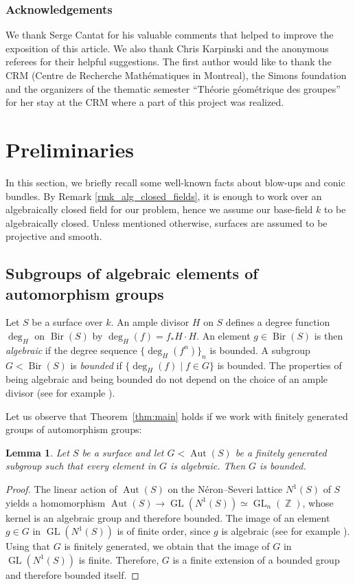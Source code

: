 \documentclass[11pt]{article}
\numberwithin{equation}{section}
\newcommand{\GL}{\operatorname{GL}}
\newcommand{\Z}{\operatorname{\mathbb{Z}}}
\newcommand{\Aut}{\operatorname{Aut}}
\newcommand{\Bir}{\operatorname{Bir}}
\theoremstyle{plain}
\newtheorem{lemma}[theorem]{Lemma}
\theoremstyle{definition}
\begin{document}
\subsubsection*{Acknowledgements}
We thank Serge Cantat for his valuable comments that helped to improve the exposition of this article. {We also thank Chris Karpinski and the anonymous referees for their helpful suggestions.}
The first author would like to thank the CRM (Centre de Recherche Mathématiques in Montreal), the Simons foundation and the organizers of the thematic semester ``Théorie géométrique des groupes'' for her stay at the CRM where a part of this project was realized.

\section{Preliminaries}
In this section, we briefly recall some well-known facts about blow-ups and conic bundles. {By Remark \ref{rmk_alg_closed_fields}, it is enough to work over an algebraically closed field for our problem, hence} we assume our base-field $k$ to be algebraically closed. Unless mentioned otherwise, surfaces are assumed to be projective and smooth.

\subsection{Subgroups of algebraic elements of automorphism groups}
{Let $S$ be a surface over $k$.} An ample divisor $H$ on $S$ defines a degree function $\deg_H$ on $\Bir(S)$ by $\deg_H(f)=f_*H\cdot H$. An element $g\in \Bir(S)$ is then \emph{algebraic} if the degree sequence $\{\deg_H(f^n)\}_n$ is bounded. A subgroup $G<\Bir(S)$ is \emph{bounded} if $\{\deg_H(f)\mid f\in G\}$ is bounded. The properties of being algebraic and being bounded do not depend on the choice of an ample divisor (see for example \cite{MR4133708}).

Let us observe that Theorem~\ref{thm:main} holds if we work with finitely generated groups of automorphism groups:

\begin{lemma}\label{lem:aut}
Let $S$ be a
surface and let $G<\Aut(S)$ be a finitely generated subgroup such that every element in $G$ is algebraic. Then $G$ is bounded.
\end{lemma}

\begin{proof}
The linear action of $\Aut(S)$ on the Néron--Severi lattice $N^1(S)$ of $S$ yields a homomorphism $\Aut(S)\to\GL(N^1(S))\simeq \GL_n(\Z)$, whose kernel is an algebraic group and therefore bounded. The image of an element $g\in G$ in $\GL(N^1(S))$ is of finite order, since $g$ is algebraic (see for example \cite[Th.\,4.6]{cantat2015cremona}). Using that $G$ is finitely generated, we obtain that the image of $G$ in $\GL(N^1(S))$ is finite. Therefore, $G$ is a finite extension of a bounded group and therefore bounded itself.
\end{proof}
\end{document}
